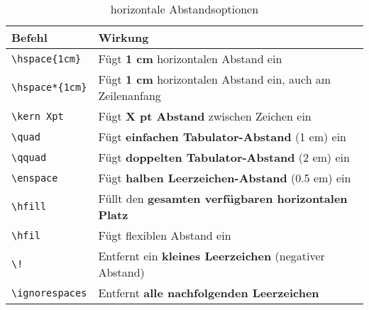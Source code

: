 \begin{table}[h]
    \centering
    \begin{tabular}{lp{10cm}}
        \toprule
        \textbf{Befehl}                        & \textbf{Wirkung}                                                  \\
        \midrule
        \texttt{\textbackslash hspace\{1cm\}}  & Fügt \textbf{1 cm} horizontalen Abstand ein                       \\
        \texttt{\textbackslash hspace*\{1cm\}} & Fügt \textbf{1 cm} horizontalen Abstand ein, auch am Zeilenanfang \\
        \texttt{\textbackslash kern Xpt}       & Fügt \textbf{X pt Abstand} zwischen Zeichen ein                   \\
        \texttt{\textbackslash quad}           & Fügt \textbf{einfachen Tabulator-Abstand} (1 em) ein              \\
        \texttt{\textbackslash qquad}          & Fügt \textbf{doppelten Tabulator-Abstand} (2 em) ein              \\
        \texttt{\textbackslash enspace}        & Fügt \textbf{halben Leerzeichen-Abstand} (0.5 em) ein             \\
        \texttt{\textbackslash hfill}          & Füllt den \textbf{gesamten verfügbaren horizontalen Platz}        \\
        \texttt{\textbackslash hfil}           & Fügt flexiblen Abstand ein                                        \\
        \midrule
        \texttt{\textbackslash !}              & Entfernt ein \textbf{kleines Leerzeichen} (negativer Abstand)     \\
        \texttt{\textbackslash ignorespaces}   & Entfernt \textbf{alle nachfolgenden Leerzeichen}                  \\
        \bottomrule
    \end{tabular}
    \caption{horizontale Abstandsoptionen}
    \label{tab:horizontale_abstaende}
\end{table}